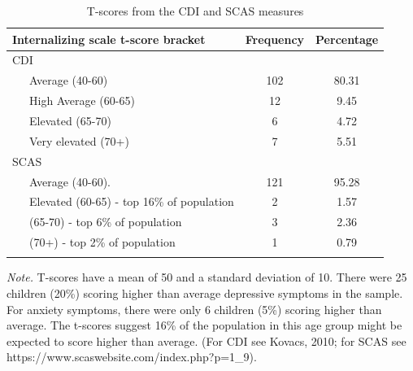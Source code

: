 \documentclass[
  english,
  man,floatsintext]{apa6}
\begin{document}
\begin{table}[tbp]

\begin{center}
\begin{threeparttable}

\caption{\label{tab:tscore_table}T-scores from the CDI and SCAS measures}

\small{

\begin{tabular}{lcc}
\toprule
Internalizing scale t-score bracket & Frequency & Percentage\\
\midrule
CDI &  & \\
\ \ \ Average (40-60) & 102 & 80.31\\
\ \ \ High Average (60-65) & 12 & 9.45\\
\ \ \ Elevated (65-70) & 6 & 4.72\\
\ \ \ Very elevated (70+) & 7 & 5.51\\
SCAS &  & \\
\ \ \ Average (40-60). & 121 & 95.28\\
\ \ \ Elevated (60-65) - top 16\% of population & 2 & 1.57\\
\ \ \ (65-70) - top 6\% of population & 3 & 2.36\\
\ \ \ (70+) - top 2\% of population & 1 & 0.79\\
\bottomrule
\addlinespace
\end{tabular}

}

\begin{tablenotes}[para]
\normalsize{\textit{Note.} T-scores have a mean of 50 and a standard deviation of 10. There were 25 children 
  (20\%) scoring higher than average depressive symptoms in the sample.  For anxiety symptoms, there 
  were only 6 children (5\%) scoring higher than average. The t-scores suggest 16\% of the population 
  in this age group might be expected to score higher than average. (For CDI see Kovacs, 2010; for 
  SCAS see https://www.scaswebsite.com/index.php?p=1\_9).}
\end{tablenotes}

\end{threeparttable}
\end{center}

\end{table}
\end{document}
